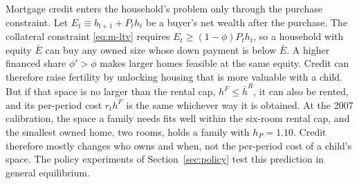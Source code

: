 Mortgage credit enters the household's problem only through the purchase
constraint. Let $E_t\equiv b_{t+1}+P_th_t$ be a buyer's net wealth after the
purchase. The collateral constraint \eqref{eq:m-ltv} requires
$E_t\geq(1-\phi)P_th_t$, so a household with equity $\bar E$ can buy any
owned size whose down payment is below $\bar E$. A higher financed share
$\phi'>\phi$ makes larger homes feasible at the same equity. Credit can
therefore raise fertility by unlocking housing that is more valuable with a
child. But if that space is no larger than the rental cap,
$h^F\leq\bar h^R$, it can also be rented, and its per-period cost $r_th^F$ is
the same whichever way it is obtained. At the 2007 calibration, the space a
family needs fits well within the six-room rental cap, and the smallest owned
home, two rooms, holds a family with $h_P=1.10$. Credit therefore mostly
changes who owns and when, not the per-period cost of a child's space. The
policy experiments of Section~\ref{sec:policy} test this prediction in
general equilibrium.
